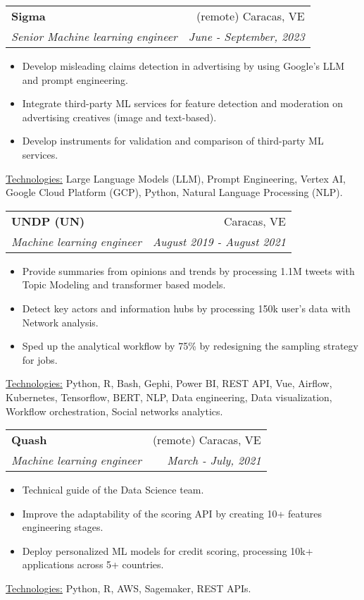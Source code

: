 \documentclass[letterpaper,11pt]{article}
\makeatletter
\newcommand{\sepsection}{\vspace{25pt}}
\newcommand{\resumeItem}[1]{%
  \item\small{
    #1
  }
}
\newcommand{\resumeSubheading}[4]{
  \vspace{8pt}\item%
    \begin{tabular*}{0.97\textwidth}[t]{l@{\extracolsep{\fill}}r}
      \textbf{#1} & #2 \\
      \textit{\small#3} & \textit{\small #4} \\
    \end{tabular*}\vspace{-5pt}
}
\newcommand{\resumeItemListStart}{\begin{itemize}}
\newcommand{\resumeItemListEnd}{\end{itemize}\vspace{-5pt}}
\newcommand{\resumeTech}[2]{
 \underline{#1:} #2
}
\makeatother
\begin{document}
    \resumeSubheading
      {Sigma}{(remote) Caracas, VE}
      {Senior Machine learning engineer}{June - September, 2023}
      \resumeItemListStart
      \resumeItem{Develop misleading claims detection in advertising by using Google's LLM and prompt engineering.}
      \resumeItem{Integrate third-party ML services for feature detection and moderation on advertising creatives (image and text-based).}
      \resumeItem{Develop instruments for validation and comparison of third-party ML services.}
      \resumeItemListEnd
      \resumeTech{Technologies}{Large Language Models (LLM), Prompt Engineering, Vertex AI, Google Cloud Platform (GCP), Python, Natural Language Processing (NLP).}\\
    \sepsection

    \resumeSubheading
      {UNDP (UN)}{Caracas, VE}
      {Machine learning engineer}{August 2019 - August 2021}
      \resumeItemListStart
      \resumeItem{Provide summaries from opinions and trends by processing 1.1M tweets with Topic Modeling \newline and transformer based models.}
      \resumeItem{Detect key actors and information hubs by processing 150k user's data with Network analysis.}
      \resumeItem{Sped up the analytical workflow by 75\% by redesigning the sampling strategy for jobs.}
      \resumeItemListEnd
      \resumeTech{Technologies}{Python, R, Bash, Gephi, Power BI, REST API, Vue, Airflow, Kubernetes, Tensorflow, BERT, NLP, Data engineering, Data visualization, Workflow orchestration, Social networks analytics.}\\

    \newpage
    \sepsection

    \resumeSubheading
      {Quash}{(remote) Caracas, VE}
      {Machine learning engineer}{March - July, 2021}
      \resumeItemListStart
      \resumeItem{Technical guide of the Data Science team.}
      \resumeItem{Improve the adaptability of the scoring API by creating 10+ features engineering stages.}
      \resumeItem{Deploy personalized ML models for credit scoring, processing 10k+ applications across 5+ countries.}
      \resumeItemListEnd
      \resumeTech{Technologies}{Python, R, AWS, Sagemaker, REST APIs.}\\
      
    \sepsection
\end{document}
